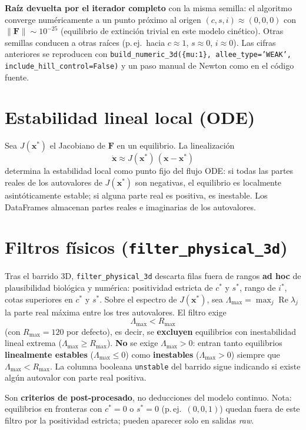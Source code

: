 \documentclass[11pt,a4paper]{article}
\begin{document}
\textbf{Raíz devuelta por el iterador completo} con la misma semilla: el algoritmo converge numéricamente a un punto próximo al origen $(c,s,i)\approx (0,0,0)$ con $\|\mathbf{F}\|\sim 10^{-25}$ (equilibrio de extinción trivial en este modelo cinético). Otras semillas conducen a otras raíces (p.\,ej.\ hacia $c\approx 1$, $s\approx 0$, $i\approx 0$). Las cifras anteriores se reproducen con \texttt{build\_numeric\_3d(\{mu:1\}, allee\_type='WEAK', include\_hill\_control=False)} y un paso manual de Newton como en el código fuente.

\section{Estabilidad lineal local (ODE)}

Sea $J(\mathbf{x}^\ast)$ el Jacobiano de $\mathbf{F}$ en un equilibrio. La linealización
\[
\dot{\mathbf{x}} \approx J(\mathbf{x}^\ast)\,(\mathbf{x}-\mathbf{x}^\ast)
\]
determina la estabilidad local como punto fijo del flujo ODE: si todas las partes reales de los autovalores de $J(\mathbf{x}^\ast)$ son negativas, el equilibrio es localmente asintóticamente estable; si alguna parte real es positiva, es inestable. Los DataFrames almacenan partes reales e imaginarias de los autovalores.

\section{Filtros físicos (\texttt{filter\_physical\_3d})}

Tras el barrido 3D, \texttt{filter\_physical\_3d} descarta filas fuera de rangos \textbf{ad hoc} de plausibilidad biológica y numérica: positividad estricta de $c^\ast$ y $s^\ast$, rango de $i^\ast$, cotas superiores en $c^\ast$ y $s^\ast$. Sobre el espectro de $J(\mathbf{x}^\ast)$, sea $\Lambda_{\max}=\max_j \operatorname{Re}\lambda_j$ la parte real máxima entre los tres autovalores. El filtro exige
\[
\Lambda_{\max} < R_{\max}
\]
(con $R_{\max}=120$ por defecto), es decir, se \textbf{excluyen} equilibrios con inestabilidad lineal extrema ($\Lambda_{\max}\geq R_{\max}$). \textbf{No} se exige $\Lambda_{\max}>0$: entran tanto equilibrios \textbf{linealmente estables} ($\Lambda_{\max}\leq 0$) como \textbf{inestables} ($\Lambda_{\max}>0$) siempre que $\Lambda_{\max}<R_{\max}$. La columna booleana \texttt{unstable} del barrido sigue indicando si existe algún autovalor con parte real positiva.

Son \textbf{criterios de post-procesado}, no deducciones del modelo continuo. Nota: equilibrios en fronteras con $c^\ast=0$ o $s^\ast=0$ (p.\,ej.\ $(0,0,1)$) quedan fuera de este filtro por la positividad estricta; pueden aparecer solo en salidas \emph{raw}.
\end{document}
